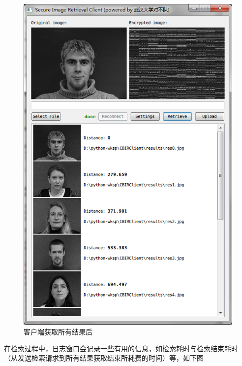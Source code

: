 \begin{figure}[H]
  \centering
  \includegraphics[keepaspectratio=true]{images/ui-retrieve-done.png}
  \caption{客户端获取所有结果后}
  \label{fig:ui-retrieve-done}
\end{figure}

在检索过程中，日志窗口会记录一些有用的信息，如检索耗时与检索结束耗时
（从发送检索请求到所有结果获取结束所耗费的时间）等，如下图


